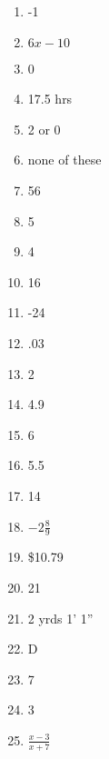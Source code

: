 \documentclass[../uilmath.tex]{subfiles}
\begin{document}
\begin{enumerate}[label=\bfseries\arabic*.]
    \item %
    -1

    \item %
    $6x-10$

    \item %
    0

    \item %
    17.5 hrs 

    \item %
    2 or 0 

    \item %
    none of these 

    \item %
    56

    \item %
    5

    \item %
    4

    \item %
    16

    \item %
    -24

    \item %
    .03 

    \item %
    2

    \item %
    4.9

    \item %
    6

    \item %
    5.5

    \item %
    14

    \item %
    $-2\frac{8}{9}$

    \item %
    \$10.79

    \item %
    21

    \item %
    2 yrds 1' 1'' 

    \item %
    D 

    \item %
    7

    \item %
    3

    \item %
    $\frac{x-3}{x+7}$


\end{enumerate}
\end{document}
